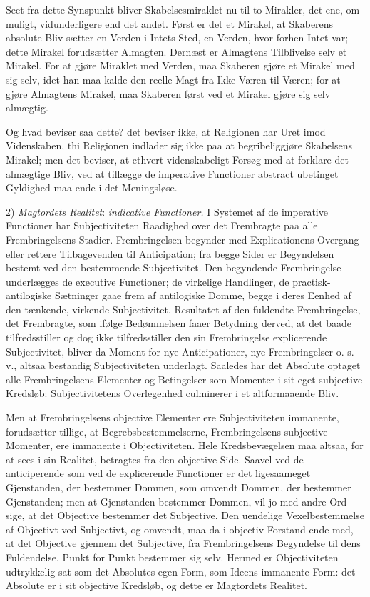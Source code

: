 \documentclass[12pt]{book}
\newcommand{\opage}[1]{\marginnote{\footnotesize\textit{[#1]}}}
\begin{document}
Seet fra dette Synspunkt bliver Skabelsesmiraklet nu
\opage{157}til to Mirakler, det ene, om muligt, vidunderligere end det
andet. Først er det et Mirakel, at Skaberens absolute Bliv
sætter en Verden i Intets Sted, en Verden, hvor forhen
Intet var; dette Mirakel forudsætter Almagten. Dernæst er
Almagtens Tilblivelse selv et Mirakel. For at gjøre Miraklet
med Verden, maa Skaberen gjøre et Mirakel med sig selv,
idet han maa kalde den reelle Magt fra Ikke-Væren til
Væren; for at gjøre Almagtens Mirakel, maa Skaberen først
ved et Mirakel gjøre sig selv almægtig.

Og hvad beviser saa dette? det beviser ikke, at Religionen
har Uret imod Videnskaben, thi Religionen indlader sig ikke
paa at begribeliggjøre Skabelsens Mirakel; men det beviser,
at ethvert videnskabeligt Forsøg med at forklare det almægtige
Bliv, ved at tillægge de imperative Functioner abstract ubetinget
Gyldighed maa ende i det Meningsløse.

2) \emph{Magtordets Realitet}: \emph{indicative Functioner.}
I Systemet af de imperative Functioner har Subjectiviteten
Raadighed over det Frembragte paa alle Frembringelsens
Stadier. Frembringelsen begynder med Explicationens Overgang
eller rettere Tilbagevenden til Anticipation; fra begge
Sider er Begyndelsen bestemt ved den bestemmende Subjectivitet.
Den begyndende Frembringelse underlægges de executive
Functioner; de virkelige Handlinger, de practisk-antilogiske
Sætninger gaae frem af antilogiske Domme, begge i
deres Eenhed af den tænkende, virkende Subjectivitet. Resultatet
af den fuldendte Frembringelse, det Frembragte, som
ifølge Bedømmelsen faaer Betydning derved, at det baade tilfredsstiller
og dog ikke tilfredsstiller den sin Frembringelse explicerende
Subjectivitet, bliver da Moment for nye Anticipationer,
nye Frembringelser o. s. v., altsaa bestandig Subjectiviteten
underlagt. Saaledes har det Absolute optaget alle
Frembringelsens Elementer og Betingelser som Momenter i
sit eget subjective Kredsløb: Subjectivitetens Overlegenhed
culminerer i et altformaaende Bliv.

\opage{158}Men at Frembringelsens objective Elementer ere Subjectiviteten
immanente, forudsætter tillige, at Begrebsbestemmelserne,
Frembringelsens subjective Momenter, ere immanente
i Objectiviteten. Hele Kredsbevægelsen maa altsaa, for at
sees i sin Realitet, betragtes fra den objective Side. Saavel
ved de anticiperende som ved de explicerende Functioner er
det ligesaameget Gjenstanden, der bestemmer Dommen, som
omvendt Dommen, der bestemmer Gjenstanden; men at Gjenstanden
bestemmer Dommen, vil jo med andre Ord sige, at
det Objective bestemmer det Subjective. Den uendelige Vexelbestemmelse
af Objectivt ved Subjectivt, og omvendt, maa da
i objectiv Forstand ende med, at det Objective gjennem det
Subjective, fra Frembringelsens Begyndelse til dens Fuldendelse,
Punkt for Punkt bestemmer sig selv. Hermed er Objectiviteten
udtrykkelig sat som det Absolutes egen Form, som
Ideens immanente Form: det Absolute er i sit objective Kredsløb,
og dette er Magtordets Realitet.
\end{document}
